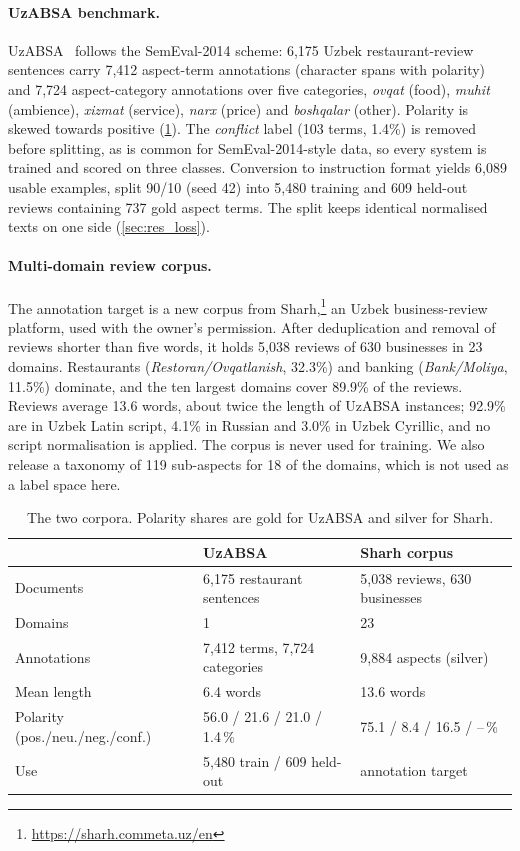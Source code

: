 \documentclass[runningheads]{llncs}
\begin{document}
\paragraph{UzABSA benchmark.} UzABSA~\cite{matlatipov-etal-2024-uzabsa} follows the SemEval-2014 scheme: 6,175 Uzbek restaurant-review sentences carry 7,412 aspect-term annotations (character spans with polarity) and 7,724 aspect-category annotations over five categories, \textit{ovqat} (food), \textit{muhit} (ambience), \textit{xizmat} (service), \textit{narx} (price) and \textit{boshqalar} (other). Polarity is skewed towards positive (\cref{tab:data}). The \textit{conflict} label (103 terms, 1.4\%) is removed before splitting, as is common for SemEval-2014-style data, so every system is trained and scored on three classes. Conversion to instruction format yields 6,089 usable examples, split 90/10 (seed 42) into 5,480 training and 609 held-out reviews containing 737 gold aspect terms. The split keeps identical normalised texts on one side (\cref{sec:res_loss}).

\paragraph{Multi-domain review corpus.} The annotation target is a new corpus from Sharh,\footnote{\url{https://sharh.commeta.uz/en}} an Uzbek business-review platform, used with the owner's permission. After deduplication and removal of reviews shorter than five words, it holds 5,038 reviews of 630 businesses in 23 domains. Restaurants (\textit{Restoran/Ovqatlanish}, 32.3\%) and banking (\textit{Bank/Moliya}, 11.5\%) dominate, and the ten largest domains cover 89.9\% of the reviews. Reviews average 13.6 words, about twice the length of UzABSA instances; 92.9\% are in Uzbek Latin script, 4.1\% in Russian and 3.0\% in Uzbek Cyrillic, and no script normalisation is applied. The corpus is never used for training. We also release a taxonomy of 119 sub-aspects for 18 of the domains, which is not used as a label space here.

\begin{table}[t]
\centering
\caption{The two corpora. Polarity shares are gold for UzABSA and silver for Sharh.}
\label{tab:data}
\setlength{\tabcolsep}{5pt}
\footnotesize
\begin{tabular}{@{}lll@{}}
\toprule
 & \textbf{UzABSA} & \textbf{Sharh corpus} \\
\midrule
Documents & 6,175 restaurant sentences & 5,038 reviews, 630 businesses \\
Domains & 1 & 23 \\
Annotations & 7,412 terms, 7,724 categories & 9,884 aspects (silver) \\
Mean length & 6.4 words & 13.6 words \\
Polarity (pos./neu./neg./conf.) & 56.0 / 21.6 / 21.0 / 1.4\,\% & 75.1 / 8.4 / 16.5 / --\,\% \\
Use & 5,480 train / 609 held-out & annotation target \\
\bottomrule
\end{tabular}
\end{table}
\end{document}
